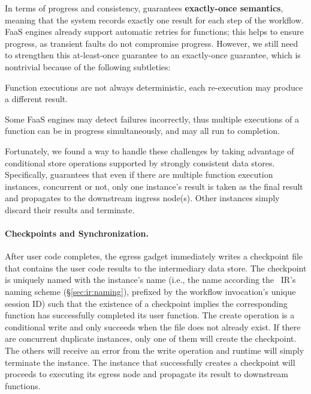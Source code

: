 In terms of progress and consistency, \name{} guarantees \textbf{exactly-once semantics}, 
meaning that the system records
exactly one result for each step of the workflow. FaaS engines already
support automatic retries for functions; this helps to ensure progress, as transient
faults do not compromise progress. However, we still need to
strengthen this at-least-once guarantee to an exactly-once guarantee, which 
is nontrivial because of the following subtleties:

\squishlist
	\item Function executions are not always deterministic, each re-execution
	may produce a different result.
	\item Some FaaS engines may detect failures incorrectly, thus multiple
	executions of a function can be in progress simultaneously, and may all run to completion.
\squishend

Fortunately, we found a way to handle these challenges by taking advantage of
conditional store operations supported by strongly consistent data stores.
Specifically, \name{} guarantees that even if there are multiple function
execution instances, concurrent or not, only one instance's result is taken as
the final result and propagates to the downstream ingress node(s). Other
instances simply discard their results and terminate.

\paragraph{Checkpoints and Synchronization.}%
After user code completes, the \name{} egress gadget immediately writes a checkpoint file that contains the user code
results to the intermediary data store. The checkpoint is uniquely named with
the instance's name (i.e., the name according the
\name{}~IR's naming scheme (\S\ref{sec:ir:naming}), prefixed by the workflow
invocation's unique session ID) such that the existence of a checkpoint
implies the corresponding function has successfully completed its user
function. The create operation is a conditional write and only succeeds when
the file does not already exist. If there are concurrent duplicate instances,
only one of them will create the checkpoint. The others will receive an error
from the write operation and \name{} runtime will simply terminate the
instance. The instance that successfully creates a checkpoint will proceeds to
executing its egress node and propagate its result to downstream functions.

